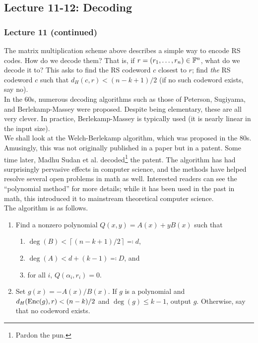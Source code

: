 	\subsection{Lecture 11-12: Decoding}

		\subsubsection{Lecture 11 (continued)}

			The matrix multiplication scheme above describes a simple way to encode RS codes. How do we decode them? That is, if $r = (r_1,\ldots,r_n) \in \mathbb{F}^n$, what do we decode it to? This asks to find the RS codeword $c$ closest to $r$; find \emph{the} RS codeword $c$ such that $d_H(c,r) < (n-k+1)/2$ (if no such codeword exists, say no). \\ %

			In the 60s, numerous decoding algorithms such as those of Peterson, Sugiyama, and Berlekamp-Massey were proposed. Despite being elementary, these are all very clever. In practice, Berlekamp-Massey is typically used (it is nearly linear in the input size).\\
			We shall look at the Welch-Berlekamp algorithm, which was proposed in the 80s. Amusingly, this was not originally published in a paper but in a patent. Some time later, Madhu Sudan et al. decoded\footnote{Pardon the pun.} the patent. The algorithm has had surprisingly pervasive effects in computer science, and the methods have helped resolve several open problems in math as well. Interested readers can see the ``polynomial method'' for more details; while it has been used in the past in math, this introduced it to mainstream theoretical computer science. \\
			The algorithm is as follows.

			\begin{enumerate}
				\item Find a nonzero polynomial $Q(x,y) = A(x) + yB(x)$ such that
				\begin{enumerate}
					\item $\deg(B) < \left\lceil (n-k+1)/2 \right\rceil \eqqcolon d$,
					\item $\deg(A) < d + (k-1) \eqqcolon D$, and
					\item for all $i$, $Q(\alpha_i,r_i) = 0$.
				\end{enumerate}
				\item Set $g(x) = -A(x)/B(x)$. If $g$ is a polynomial and $d_H(\operatorname{Enc}(g),r) < (n-k)/2$ and $\deg(g) \le k-1$, output $g$. Otherwise, say that no codeword exists.
			\end{enumerate}

